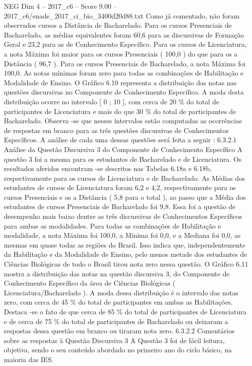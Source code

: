 \begin{textsample}{NEG Dim 4 – 2017\_c6 – Score 9.00 – 2017\_c6/enade\_2017\_ci\_bio\_3400d20d88.txt}
Como já comentado, não foram observados cursos a Distância de Bacharelado.
Para os cursos Presenciais de Bacharelado, as médias equivalentes foram 60,6 para as discursivas de Formação Geral e 23,2 para as de Conhecimento Específico.
Para os cursos de Licenciatura, a nota Máxima foi maior para os cursos Presenciais ( 100,0 ) do que para os a Distância ( 96,7 ).
Para os cursos Presenciais de Bacharelado, a nota Máxima foi 100,0.
As notas mínimas foram zero para todas as combinações de Habilitação e Modalidade de Ensino.
O Gráfico 6.10 representa a distribuição das notas nas questões discursivas no Componente de Conhecimento Específico.
A moda desta distribuição ocorre no intervalo [ 0 ; 10 ], com cerca de 20 \% do total de participantes de Licenciatura e mais do que 30 \% do total de participantes de Bacharelado.
Observa -se que nesses intervalos estão computadas as ocorrências de respostas em branco para as três questões discursivas de Conhecimentos Específicos.
A análise de cada uma dessas questões será feita a seguir : 6.3.2.1 Análise da Questão Discursiva 3 do Componente de Conhecimento Específico A questão 3 foi a mesma para os estudantes de Bacharelado e de Licenciatura.
Os resultados aferidos encontram -se descritos nas Tabelas 6.18a e 6.18b, respectivamente para os cursos de Licenciatura e de Bacharelado.
As Médias dos estudantes de cursos de Licenciatura foram 6,2 e 4,2, respectivamente para os cursos Presenciais e os a Distância ( 5,8 para o total ), ao passo que a Média dos estudantes de cursos Presenciais de Bacharelado foi 9,8.
Essa foi a questão de desempenho mais baixo dentre as três discursivas de Conhecimentos Específicos para ambas as modalidades.
Para todas as combinações de Habilitação e modalidade, a nota Máxima foi 100,0, a Mínima foi 0,0, e a Mediana foi 0,0, as mesmas em quase todas as regiões do Brasil.
Isso indica que, independentemente da Habilitação e da Modalidade de Ensino, pelo menos metade dos estudantes de Ciências Biológicas de todo o Brasil tirou nota zero nessa questão.
O Gráfico 6.11 mostra a distribuição das notas na questão discursiva 3, do Componente de Conhecimento Específico da área de Ciências Biológicas ( Licenciatura/Bacharelado ).
A moda dessa distribuição é o intervalo das notas zero, com cerca de 45 \% do total de participantes em ambas as Habilitações.
Destaca -se o fato de que cerca de 85 \% do total de participantes de Licenciatura e de cerca de 75 \% do total de participantes de Bacharelado ou deixaram a respostas dessa questão em branco ou tiraram nota zero. 6.3.2.2 Comentários sobre as respostas à Questão Discursiva 3 A Questão 3 foi de fácil leitura, objetiva, sendo o seu conteúdo abordado no primeiro ano do ciclo básico, na maioria das IES.

\end{textsample}
